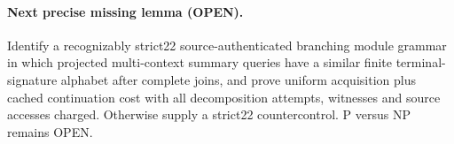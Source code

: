 \documentclass[11pt]{article}
\begin{document}
\paragraph{Next precise missing lemma (OPEN).} Identify a recognizably strict22 source-authenticated branching module grammar in which projected multi-context summary queries have a similar finite terminal-signature alphabet after complete joins, and prove uniform acquisition plus cached continuation cost with all decomposition attempts, witnesses and source accesses charged. Otherwise supply a strict22 countercontrol. P versus NP remains OPEN.
\end{document}
